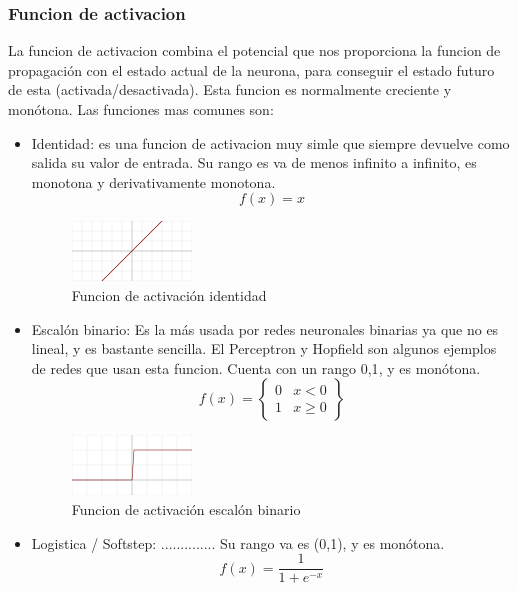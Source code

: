 \subsubsection {Funcion de activacion}
La funcion de activacion combina el potencial que nos proporciona la funcion de propagación con el estado actual de la neurona, para conseguir el estado futuro de esta (activada/desactivada). Esta funcion es normalmente creciente y monótona. Las funciones mas comunes son:
\begin{itemize}
\item Identidad: es una funcion de activacion muy simle que siempre devuelve como salida su valor de entrada. Su rango es va de menos infinito a infinito, es monotona y derivativamente monotona.
\begin{equation}
f(x) = x
\end{equation}
\begin{figure}[htp]
\centering
\includegraphics[scale=1]{images/Activation_identity.png}
\caption{Funcion de activación identidad}
\end{figure}
\item Escalón binario: Es la más usada por redes neuronales binarias ya que no es lineal, y es bastante sencilla. El Perceptron y Hopfield son algunos ejemplos de redes que usan esta funcion. Cuenta con un rango {0,1}, y es monótona.
\begin{equation}
f(x) = \begin{Bmatrix}
0 & x<0\\ 
1 & x\geq 0
\end{Bmatrix}
\end{equation}
\begin{figure}[htp]
\centering
\includegraphics[scale=1]{images/Activation_binary_step.png}
\caption{Funcion de activación escalón binario}
\end{figure}
\item Logistica / Softstep: .............. Su rango va es (0,1), y es monótona.
\begin{equation}
f(x) = \frac{1}{1+e^{-x}}
\end{equation}
\begin{figure}[htp]

\end{figure}
\end{itemize}
